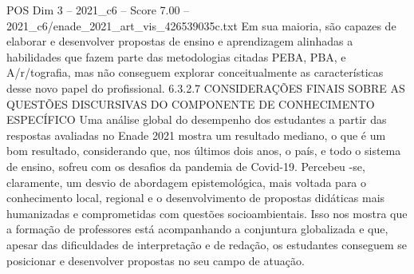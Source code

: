\begin{textsample}{POS Dim 3 – 2021\_c6 – Score 7.00 – 2021\_c6/enade\_2021\_art\_vis\_426539035c.txt}
Em sua maioria, são capazes de elaborar e desenvolver propostas de ensino e aprendizagem alinhadas a habilidades que fazem parte das metodologias citadas PEBA, PBA, e A/r/tografia, mas não conseguem explorar conceitualmente as características desse novo papel do profissional. 6.3.2.7 CONSIDERAÇÕES FINAIS SOBRE AS QUESTÕES DISCURSIVAS DO COMPONENTE DE CONHECIMENTO ESPECÍFICO Uma análise global do desempenho dos estudantes a partir das respostas avaliadas no Enade 2021 mostra um resultado mediano, o que é um bom resultado, considerando que, nos últimos dois anos, o país, e todo o sistema de ensino, sofreu com os desafios da pandemia de Covid-19.
Percebeu -se, claramente, um desvio de abordagem epistemológica, mais voltada para o conhecimento local, regional e o desenvolvimento de propostas didáticas mais humanizadas e comprometidas com questões socioambientais.
Isso nos mostra que a formação de professores está acompanhando a conjuntura globalizada e que, apesar das dificuldades de interpretação e de redação, os estudantes conseguem se posicionar e desenvolver propostas no seu campo de atuação.

\end{textsample}
